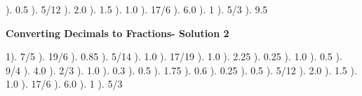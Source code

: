 \documentclass{article}%
\begin{document}
). 0.5%
). 5/12%
). 2.0%
). 1.5%
). 1.0%
). 17/6%
). 6.0%
). 1%
). 5/3%
). 9.5%
\newline%
\newpage%
\large%
\begin{center}%
\textbf{Converting Decimals to Fractions- Solution 2}%
\newline%
\end{center} \normalsize%
1). 7/5%
). 19/6%
). 0.85%
). 5/14%
). 1.0%
). 17/19%
). 1.0%
). 2.25%
). 0.25%
). 1.0%
). 0.5%
). 9/4%
). 4.0%
). 2/3%
). 1.0%
). 0.3%
). 0.5%
). 1.75%
). 0.6%
). 0.25%
). 0.5%
). 5/12%
). 2.0%
). 1.5%
). 1.0%
). 17/6%
). 6.0%
). 1%
). 5/3%
\newline%
\end{document}
